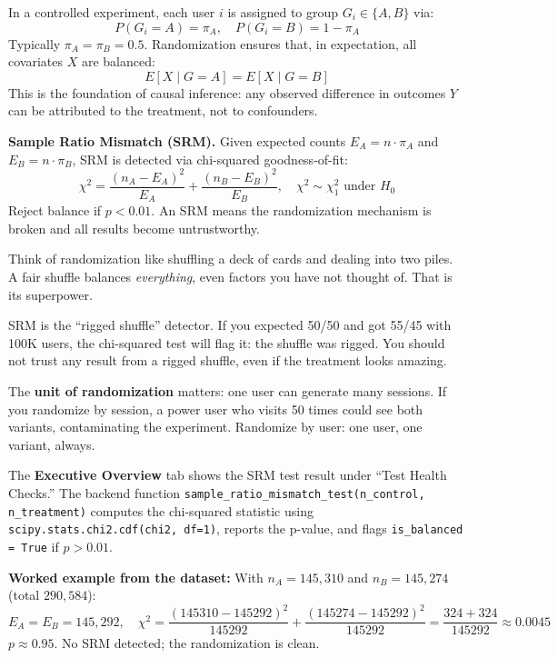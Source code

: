 \documentclass[11pt,a4paper]{article}
\newcommand{\code}[1]{\texttt{#1}}
\newcommand{\scipy}[1]{\texttt{scipy.stats.#1}}
\begin{document}
\begin{formaldef}
In a controlled experiment, each user $i$ is assigned to group $G_i \in \{A, B\}$ via:
\[
P(G_i = A) = \pi_A, \quad P(G_i = B) = 1 - \pi_A
\]
Typically $\pi_A = \pi_B = 0.5$. Randomization ensures that, in expectation, all covariates $X$ are balanced:
\[
E[X \mid G = A] = E[X \mid G = B]
\]
This is the foundation of causal inference: any observed difference in outcomes $Y$ can be attributed to the treatment, not to confounders.

\medskip
\textbf{Sample Ratio Mismatch (SRM).} Given expected counts $E_A = n \cdot \pi_A$ and $E_B = n \cdot \pi_B$, SRM is detected via chi-squared goodness-of-fit:
\[
\chi^2 = \frac{(n_A - E_A)^2}{E_A} + \frac{(n_B - E_B)^2}{E_B}, \quad \chi^2 \sim \chi^2_1 \text{ under } H_0
\]
Reject balance if $p < 0.01$. An SRM means the randomization mechanism is broken and all results become untrustworthy.
\end{formaldef}

\vspace{8pt}

\begin{intuition}
Think of randomization like shuffling a deck of cards and dealing into two piles. A fair shuffle balances \emph{everything}, even factors you have not thought of. That is its superpower.

SRM is the ``rigged shuffle'' detector. If you expected 50/50 and got 55/45 with 100K users, the chi-squared test will flag it: the shuffle was rigged. You should not trust any result from a rigged shuffle, even if the treatment looks amazing.

The \textbf{unit of randomization} matters: one user can generate many sessions. If you randomize by session, a power user who visits 50 times could see both variants, contaminating the experiment. Randomize by user: one user, one variant, always.
\end{intuition}

\vspace{8pt}

\begin{application}
The \textbf{Executive Overview} tab shows the SRM test result under ``Test Health Checks.'' The backend function \code{sample\_ratio\_mismatch\_test(n\_control, n\_treatment)} computes the chi-squared statistic using \scipy{chi2.cdf(chi2, df=1)}, reports the p-value, and flags \code{is\_balanced = True} if $p > 0.01$.

\medskip
\textbf{Worked example from the dataset:} With $n_A = 145{,}310$ and $n_B = 145{,}274$ (total $290{,}584$):
\[
E_A = E_B = 145{,}292, \quad \chi^2 = \frac{(145310 - 145292)^2}{145292} + \frac{(145274 - 145292)^2}{145292} = \frac{324 + 324}{145292} \approx 0.0045
\]
$p \approx 0.95$. No SRM detected; the randomization is clean.
\end{application}
\end{document}
